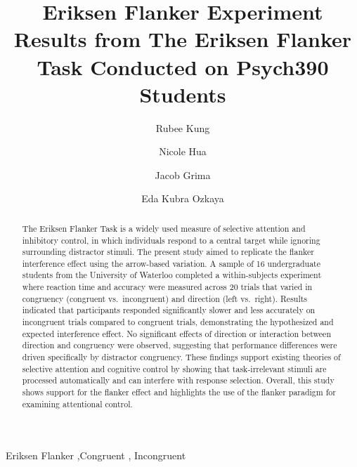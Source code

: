 \documentclass[
  authoryear,
  preprint]{elsarticle}
\begin{document}
\begin{frontmatter}
\title{Eriksen Flanker Experiment \\\large{Results from The Eriksen
Flanker Task Conducted on Psych390 Students} }
\author[1]{Rubee Kung%
%
}
\author[1]{Nicole Hua%
%
}
\author[1]{Jacob Grima%
%
}
\author[1]{Eda Kubra Ozkaya%
%
}






        
\begin{abstract}
The Eriksen Flanker Task is a widely used measure of selective attention
and inhibitory control, in which individuals respond to a central target
while ignoring surrounding distractor stimuli. The present study aimed
to replicate the flanker interference effect using the arrow-based
variation. A sample of 16 undergraduate students from the University of
Waterloo completed a within-subjects experiment where reaction time and
accuracy were measured across 20 trials that varied in congruency
(congruent vs.~incongruent) and direction (left vs.~right). Results
indicated that participants responded significantly slower and less
accurately on incongruent trials compared to congruent trials,
demonstrating the hypothesized and expected interference effect. No
significant effects of direction or interaction between direction and
congruency were observed, suggesting that performance differences were
driven specifically by distractor congruency. These findings support
existing theories of selective attention and cognitive control by
showing that task-irrelevant stimuli are processed automatically and can
interfere with response selection. Overall, this study shows support for
the flanker effect and highlights the use of the flanker paradigm for
examining attentional control.
\end{abstract}





\begin{keyword}
    Eriksen Flanker \sep Congruent \sep 
    Incongruent
\end{keyword}
\end{frontmatter}
    
\end{document}
